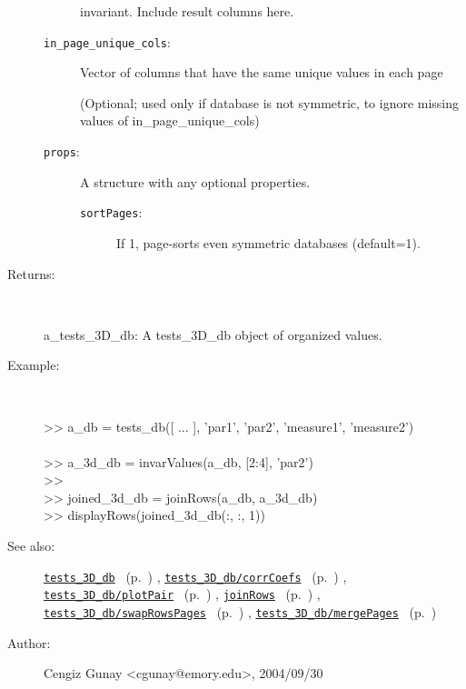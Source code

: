 \begin{description}
\begin{description}
invariant. Include result columns here.
\item[\texttt{in\_page\_unique\_cols}:]
 Vector of columns that have the same unique values in each page 

(Optional; used only if database is not symmetric, to ignore 
missing values of in\_page\_unique\_cols)
\item[\texttt{props}:]
 A structure with any optional properties.
\begin{description}%
\item[\texttt{sortPages}:]
 If 1, page-sorts even symmetric databases (default=1).
\end{description}%
\end{description}%
%
\item[Returns:
]~

	a\_tests\_3D\_db: A tests\_3D\_db object of organized values.
%
\item[Example:]~
\begin{lyxcode} >> a\_db = tests\_db([ ... ], {'par1', 'par2', 'measure1', 'measure2'})
\\%
\\%
 >> a\_3d\_db = invarValues(a\_db, [2:4], 'par2')
\\%
 >> %
\\%
 >> joined\_3d\_db = joinRows(a\_db, a\_3d\_db)
\\%
 >> displayRows(joined\_3d\_db(:, :, 1))
\\%
\end{lyxcode}
%
\item[See also:]%
\hyperlink{ref_tests_3D_db}{\texttt{tests\_3D\_db}}%
\ (p.~\pageref{ref_tests_3D_db})%
%
, \hyperlink{ref_tests_3D_db__corrCoefs}{\texttt{tests\_3D\_db/corrCoefs}}%
\ (p.~\pageref{ref_tests_3D_db__corrCoefs})%
%
, \hyperlink{ref_tests_3D_db__plotPair}{\texttt{tests\_3D\_db/plotPair}}%
\ (p.~\pageref{ref_tests_3D_db__plotPair})%
%
, \hyperlink{ref_joinRows}{\texttt{joinRows}}%
\ (p.~\pageref{ref_joinRows})%
%
, \hyperlink{ref_tests_3D_db__swapRowsPages}{\texttt{tests\_3D\_db/swapRowsPages}}%
\ (p.~\pageref{ref_tests_3D_db__swapRowsPages})%
%
, \hyperlink{ref_tests_3D_db__mergePages}{\texttt{tests\_3D\_db/mergePages}}%
\ (p.~\pageref{ref_tests_3D_db__mergePages})%
%
%
\item[Author:]%
Cengiz Gunay <cgunay@emory.edu>, 2004/09/30
%
\end{description}
\methodline%
